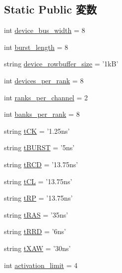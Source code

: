 \subsection*{Static Public 変数}
\begin{DoxyCompactItemize}
\item 
int \hyperlink{classDRAMCtrl_1_1DDR3__1600__x64_ac980afb64b962aec673eeadb21ea8b0e}{device\_\-bus\_\-width} = 8
\item 
int \hyperlink{classDRAMCtrl_1_1DDR3__1600__x64_afeba385888f1ce3063d25f20c0e7a89b}{burst\_\-length} = 8
\item 
string \hyperlink{classDRAMCtrl_1_1DDR3__1600__x64_ab24d9a52c5c94331e40478cc93e9abe1}{device\_\-rowbuffer\_\-size} = '1kB'
\item 
int \hyperlink{classDRAMCtrl_1_1DDR3__1600__x64_a60039c77757fd0118d81754311d71cfb}{devices\_\-per\_\-rank} = 8
\item 
int \hyperlink{classDRAMCtrl_1_1DDR3__1600__x64_ab610af52b1f27db17e9de304176a80a8}{ranks\_\-per\_\-channel} = 2
\item 
int \hyperlink{classDRAMCtrl_1_1DDR3__1600__x64_ac43360fda587200e99a090d69163e089}{banks\_\-per\_\-rank} = 8
\item 
string \hyperlink{classDRAMCtrl_1_1DDR3__1600__x64_a78016df5bd6c91551bcf487d3d665ebe}{tCK} = '1.25ns'
\item 
string \hyperlink{classDRAMCtrl_1_1DDR3__1600__x64_af962cc8ff13de9c28027368562b67c1e}{tBURST} = '5ns'
\item 
string \hyperlink{classDRAMCtrl_1_1DDR3__1600__x64_a31691ebf1f58ff89b00f261f5adea8e2}{tRCD} = '13.75ns'
\item 
string \hyperlink{classDRAMCtrl_1_1DDR3__1600__x64_a009c2614e5d317cb4805a4a98ace1b19}{tCL} = '13.75ns'
\item 
string \hyperlink{classDRAMCtrl_1_1DDR3__1600__x64_aeda425967c3cf2880bdc1640e9733439}{tRP} = '13.75ns'
\item 
string \hyperlink{classDRAMCtrl_1_1DDR3__1600__x64_a1b5f15dad9d492ce5d0167e1581de8cc}{tRAS} = '35ns'
\item 
string \hyperlink{classDRAMCtrl_1_1DDR3__1600__x64_ad1724b7d6484bbc6051f43d4ae9e16d2}{tRRD} = '6ns'
\item 
string \hyperlink{classDRAMCtrl_1_1DDR3__1600__x64_a94c112e585153e09e803751da3cfafcd}{tXAW} = '30ns'
\item 
int \hyperlink{classDRAMCtrl_1_1DDR3__1600__x64_a8b6fa0e85fb36be7e08d5c992065d7c2}{activation\_\-limit} = 4
\item 

\end{DoxyCompactItemize}
